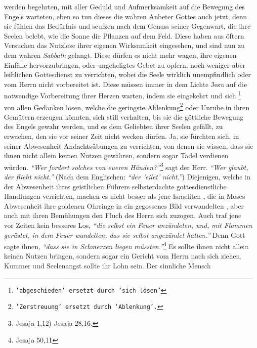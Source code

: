 werden begehrten, mit aller Geduld und Aufmerksamkeit auf
die Bewegung des
Engels warteten, eben so tun dieses die wahren Anbeter Gottes auch jetzt, denn
sie fühlen das Bedürfnis und seufzen nach dem Genuss seiner Gegenwart, die
ihre Seelen belebt, wie die Sonne die Pflanzen auf dem Feld. Diese haben aus
öftern Versuchen das Nutzlose ihrer eigenen Wirksamkeit eingesehen, und sind nun
zu dem wahren \textit{Sabbath}  gelangt. Diese dürfen es nicht
mehr wagen, ihre
eigenen Einfälle hervorzubringen, oder ungeheligtes Gebet zu opfern, noch
weniger aber leiblichen Gottesdienst zu verrichten, wobei die Seele wirklich
unempfindlich oder vom Herrn nicht vorbereitet ist. Diese müssen immer in dem
Lichte Jesu  auf die notwendige Vorbereitung ihrer Herzen
warten, indem sie
eingekehrt und sich \footnote{\texttt{'abgeschieden' ersetzt durch 'sich
lösen'}} von allen Gedanken lösen, welche die geringste
Ablenkung\footnote{\texttt{'Zerstreuung' ersetzt durch 'Ablenkung'.}}
oder Unruhe in ihren Gemütern erzeugen könnten, sich still verhalten, bis sie
die göttliche Bewegung des Engels gewahr werden, und es dem Geliebten ihrer
Seelen gefällt, zu erwachen, den sie vor seiner Zeit nicht wecken dürfen. Ja,
sie fürchten sich, in seiner Abwesenheit Andachtsübungen zu verrichten, von
denen sie wissen, dass sie ihnen nicht allein keinen Nutzen gewähren, sondern
sogar Tadel verdienen würden.
\textit{"`Wer fordert solches von eueren Händen?"'}\footnote{Jesaja 1,12) Jesaja
28,16.}
sagt der Herr.
\textit{"`Wer glaubt, der flieht nicht."'} (Nach dem Englischen: \textit{"`der
'eilet' nicht."'}) Diejenigen,
welche in der Abwesenheit ihres geistlichen Führers selbsterdachte
gottesdienstliche Handlungen verrichten, machen es nicht besser als jene
Israeliten , die in Moses
Abwesenheit ihre goldenen Ohrringe in ein
gegossenes Bild verwandelten , aber auch mit ihren
Bemühungen den Fluch  des Herrn sich zuzogen. Auch traf jene vor
Zeiten kein besseres Los,
\textit{"`die selbst ein Feuer anzündeten, und, mit Flammen gerüstet, in dem
Feuer wandelten, das sie
selbst angezündet hatten."'} Denn Gott sagte ihnen,
\textit{"`dass sie in Schmerzen liegen müssten."'}\footnote{Jesaja 50,11}
Es sollte ihnen nicht allein keinen
Nutzen bringen, sondern sogar ein Gericht vom Herrn nach sich ziehen, Kummer und
Seelenangst sollte ihr Lohn sein. Der sinnliche Mensch
